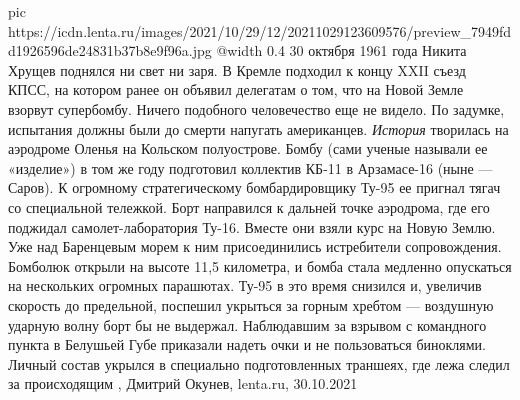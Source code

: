 \ifcmt
  pic https://icdn.lenta.ru/images/2021/10/29/12/20211029123609576/preview_7949fdd1926596de24831b37b8e9f96a.jpg
  @width 0.4
\fi
30 октября 1961 года Никита Хрущев поднялся ни свет ни заря. В Кремле подходил
к концу XXII съезд КПСС, на котором ранее он объявил делегатам о том, что на
Новой Земле взорвут супербомбу. Ничего подобного человечество еще не видело. По
задумке, испытания должны были до смерти напугать американцев.  \emph{История}
творилась на аэродроме Оленья на Кольском полуострове. Бомбу (сами ученые
называли ее «изделие») в том же году подготовил коллектив КБ-11 в Арзамасе-16
(ныне — Саров). К огромному стратегическому бомбардировщику Ту-95 ее пригнал
тягач со специальной тележкой. Борт направился к дальней точке аэродрома, где
его поджидал самолет-лаборатория Ту-16. Вместе они взяли курс на Новую Землю.
Уже над Баренцевым морем к ним присоединились истребители сопровождения.
Бомболюк открыли на высоте 11,5 километра, и бомба стала медленно опускаться на
нескольких огромных парашютах. Ту-95 в это время снизился и, увеличив скорость
до предельной, поспешил укрыться за горным хребтом — воздушную ударную волну
борт бы не выдержал. Наблюдавшим за взрывом с командного пункта в Белушьей Губе
приказали надеть очки и не пользоваться биноклями. Личный состав укрылся в
специально подготовленных траншеях, где лежа следил за происходящим
, Дмитрий Окунев, lenta.ru, 30.10.2021
